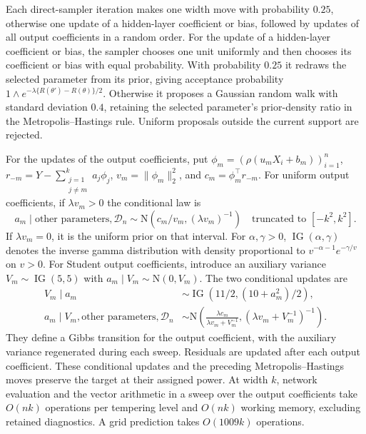 \documentclass[11pt,a4paper]{article}
\theoremstyle{remark}
\newcommand{\Dcal}{\mathcal D}
\newcommand{\norm}[1]{\lVert#1\rVert}
\begin{document}
Each direct-sampler iteration makes one width move with probability
$0.25$, otherwise one update of a hidden-layer coefficient or bias,
followed by updates of all output coefficients in a random order.
For the update of a hidden-layer coefficient or bias, the sampler chooses
one unit uniformly and then chooses its coefficient or bias with equal
probability. With probability $0.25$ it redraws the selected parameter from its prior,
giving acceptance probability
$1\wedge e^{-\lambda\{R(\theta')-R(\theta)\}/2}$.
Otherwise it proposes a Gaussian random walk with standard
deviation $0.4$, retaining the selected parameter's prior-density
ratio in the Metropolis--Hastings rule. Uniform proposals outside
the current support are rejected.

For the updates of the output coefficients, put
$\phi_m=(\rho(u_mX_i+b_m))_{i=1}^n$,
$r_{-m}=Y-\sum_{\substack{j=1\\j\ne m}}^k a_j\phi_j$,
$v_m=\norm{\phi_m}_2^2$, and $c_m=\phi_m^\top r_{-m}$.
For uniform output coefficients, if $\lambda v_m>0$ the conditional law is
\[
a_m\mid\text{other parameters},\Dcal_n
\sim\mathrm N\!\left(c_m/v_m,(\lambda v_m)^{-1}\right)
\quad\text{truncated to }[-k^2,k^2].
\]
If $\lambda v_m=0$, it is the uniform prior on that interval.
For $\alpha,\gamma>0$, $\operatorname{IG}(\alpha,\gamma)$ denotes the inverse gamma distribution with density proportional to
$v^{-\alpha-1}e^{-\gamma/v}$ on $v>0$.
For Student output coefficients, introduce an auxiliary variance
$V_m\sim\operatorname{IG}(5,5)$ with
$a_m\mid V_m\sim\mathrm N(0,V_m)$.
The two conditional updates are
\begin{equation}\label{eq:simulation-student-gibbs}
\begin{split}
V_m\mid a_m&\sim
\operatorname{IG}\!\left(11/2,(10+a_m^2)/2\right),\\
a_m\mid V_m,\text{other parameters},\Dcal_n&\sim
\mathrm N\!\left(
\frac{\lambda c_m}{\lambda v_m+V_m^{-1}},
(\lambda v_m+V_m^{-1})^{-1}\right).
\end{split}
\end{equation}
They define a Gibbs transition for the {output coefficient}, with
the auxiliary variance regenerated during each sweep.
Residuals are updated after each output coefficient. These conditional
updates and the preceding Metropolis--Hastings moves preserve
the target at their assigned power.
At width $k$, network evaluation and the vector arithmetic in a
sweep over the output coefficients take $O(nk)$ operations per tempering level and
$O(nk)$ working memory, excluding retained diagnostics. A grid
prediction takes $O(1009k)$ operations.
\end{document}
